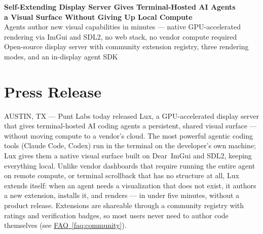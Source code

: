 \documentclass[11pt,letterpaper]{article}
\newcommand{\faqref}[1]{\hyperref[#1]{FAQ~\ref*{#1}}}
\begin{document}
\begin{center}
\end{center}
\vspace{0.5em}

\begin{center}
  {\LARGE\bfseries\color{SectionBlue}
    Self-Extending Display Server Gives Terminal-Hosted AI Agents\\
    a Visual Surface Without Giving Up Local Compute} \\[0.8em]
  {\large\color{AccentGray}
    Agents author new visual capabilities in minutes ---
    native GPU-accelerated rendering via ImGui and SDL2, no web stack,
    no vendor compute required} \\[0.3em]
  {\large\color{AccentGray}
    Open-source display server with community extension registry,
    three rendering modes, and an in-display agent SDK}
\end{center}

\vspace{0.5em}


\section*{Press Release}

AUSTIN, TX --- Punt Labs today released Lux, a
GPU-accelerated display server that gives terminal-hosted AI coding
agents a persistent, shared visual surface --- without moving compute to a
vendor's cloud.  The most powerful agentic coding tools (Claude
Code\cite{anthropic2025claudecode}, Codex) run in the terminal on the
developer's own machine; Lux gives them a native visual surface built on
Dear~ImGui\cite{imgui2025} and SDL2, keeping everything local.  Unlike
vendor dashboards that require running the entire agent on remote compute,
or terminal scrollback that has no structure at all, Lux extends itself:
when an agent needs a visualization that does not exist, it authors a new
extension, installs it, and renders --- in under five minutes, without a
product release.  Extensions are shareable through a community registry with
ratings and verification badges, so most users never need to author code
themselves (see \faqref{faq:community}).
\end{document}
